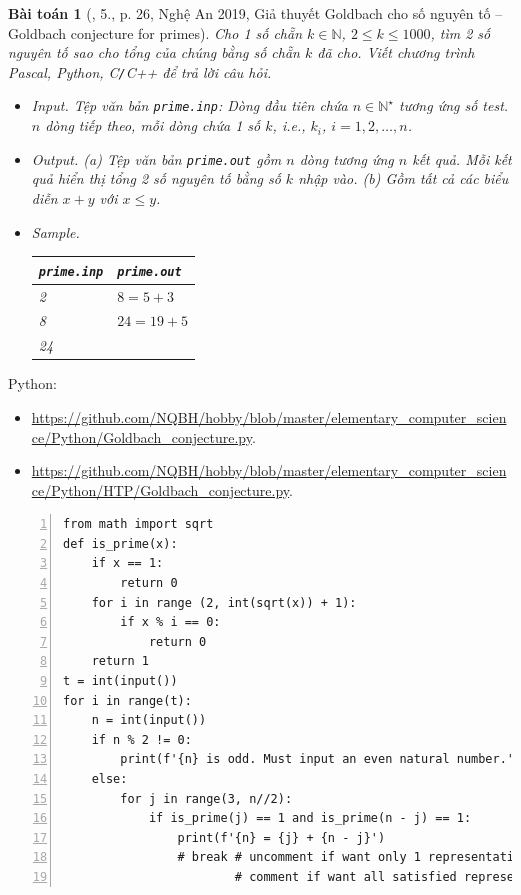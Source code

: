 \documentclass{article}
\newtheorem{baitoan}{Bài toán}
\begin{document}
\begin{baitoan}[\cite{VietSTEM2021}, 5., p. 26, Nghệ An 2019, Giả thuyết Goldbach cho số nguyên tố -- Goldbach conjecture for primes]
	Cho 1 số chẵn $k\in\mathbb{N}$, $2\le k\le1000$, tìm 2 số nguyên tố sao cho tổng của chúng bằng số chẵn $k$ đã cho. Viết chương trình {\sf Pascal, Python, C{\tt /}C++} để trả lời câu hỏi.
	\begin{itemize}
		\item {\sf Input.} Tệp văn bản \verb|prime.inp|: Dòng đầu tiên chứa $n\in\mathbb{N}^\star$ tương ứng số test. $n$ dòng tiếp theo, mỗi dòng chứa 1 số $k$, i.e., $k_i$, $i = 1,2,\ldots,n$.
		\item {\sf Output.} (a) Tệp văn bản \verb|prime.out| gồm $n$ dòng tương ứng $n$ kết quả. Mỗi kết quả hiển thị tổng 2 số nguyên tố bằng số $k$ nhập vào. (b) Gồm tất cả các biểu diễn $x + y$ với $x\le y$.
		\item {\sf Sample.}
		\begin{table}[H]
			\centering
			\begin{tabular}{|l|l|}
				\hline
				{\tt prime.inp} & {\tt prime.out} \\
				\hline
				2 & $8 = 5 + 3$ \\
				8 & $24 = 19 + 5$ \\
				24 & \\
				\hline
			\end{tabular}
		\end{table}
	\end{itemize}
\end{baitoan}
\noindent Python:
\begin{itemize}
	\item \url{https://github.com/NQBH/hobby/blob/master/elementary_computer_science/Python/Goldbach_conjecture.py}.
	\item \url{https://github.com/NQBH/hobby/blob/master/elementary_computer_science/Python/HTP/Goldbach_conjecture.py}.
\end{itemize}
\begin{Verbatim}[numbers=left,xleftmargin=5mm]
from math import sqrt
def is_prime(x):
    if x == 1:
        return 0
    for i in range (2, int(sqrt(x)) + 1):
        if x % i == 0:
            return 0
    return 1
t = int(input())
for i in range(t):
    n = int(input())
    if n % 2 != 0:
        print(f'{n} is odd. Must input an even natural number.')
    else:
        for j in range(3, n//2):
            if is_prime(j) == 1 and is_prime(n - j) == 1:
                print(f'{n} = {j} + {n - j}')
                # break # uncomment if want only 1 representation,
                        # comment if want all satisfied representations
\end{Verbatim}
\end{document}
